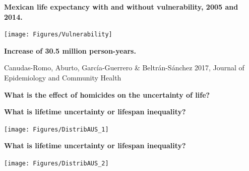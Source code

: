 \documentclass[xcolor={dvipsnames}]{beamer}
\begin{document}
\begin{frame}
	\Large{
	\begin{center}
			\textbf{Mexican life expectancy with and without vulnerability, 2005 and 2014.}
	\end{center}
	
	\begin{center}
		\texttt{[image: Figures/Vulnerability]}
		
		\pause
		
		\textbf{Increase of 30.5 million person-years.}
	\end{center}
		}
		
	\tiny{Canudas-Romo, Aburto, Garc\'ia-Guerrero \& Beltr\'an-S\'anchez 2017, Journal of Epidemiology and Community Health}
\end{frame}


\begin{frame}
	\huge{
		\begin{center}
		
		\textbf{What is the effect of homicides on the uncertainty of life?}
		
		\end{center}		

	}
\end{frame}

\begin{frame}
	\begin{center}
		\Large{\textbf{What is lifetime uncertainty or lifespan inequality?}}
	\end{center}


	\begin{center}
		\texttt{[image: Figures/DistribAUS\_1]}
	\end{center}
	
\end{frame}

\begin{frame}
	\begin{center}
		\Large{\textbf{What is lifetime uncertainty or lifespan inequality?}}
	\end{center}


	\begin{center}
		\texttt{[image: Figures/DistribAUS\_2]}
	\end{center}
			
\end{frame}
\end{document}
